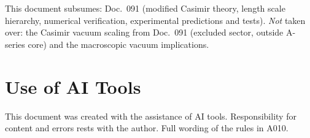 This document subsumes: Doc.~091 (modified Casimir theory, length scale hierarchy,
numerical verification, experimental predictions and tests). \emph{Not} taken over:
the Casimir vacuum scaling from Doc.~091 (excluded sector, outside A-series core)
and the macroscopic vacuum implications.

\section{Use of AI Tools}

This document was created with the assistance of AI tools. Responsibility
for content and errors rests with the author. Full wording of the rules in A010.
